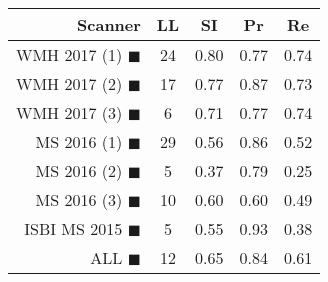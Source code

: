 \begin{tabular}{rcccc}
\toprule
Scanner & LL & SI & Pr & Re \\
\midrule
WMH 2017 (1) {\color[rgb]{ 1.00 0.00 0.00}$\blacksquare$} & 24 & 0.80 & 0.77 & 0.74 \\
WMH 2017 (2) {\color[rgb]{ 1.00 0.50 0.00}$\blacksquare$} & 17 & 0.77 & 0.87 & 0.73 \\
WMH 2017 (3) {\color[rgb]{ 1.00 0.80 0.00}$\blacksquare$} & 6 & 0.71 & 0.77 & 0.74 \\
MS  2016 (1) {\color[rgb]{ 0.20 0.80 0.00}$\blacksquare$} & 29 & 0.56 & 0.86 & 0.52 \\
MS  2016 (2) {\color[rgb]{ 0.00 0.40 1.00}$\blacksquare$} & 5 & 0.37 & 0.79 & 0.25 \\
MS  2016 (3) {\color[rgb]{ 0.60 0.00 1.00}$\blacksquare$} & 10 & 0.60 & 0.60 & 0.49 \\
ISBI MS 2015 {\color[rgb]{ 1.00 0.00 1.00}$\blacksquare$} & 5 & 0.55 & 0.93 & 0.38 \\
\midrule
ALL {\color[rgb]{ 1.00 1.00 1.00}$\blacksquare$} & 12 & 0.65 & 0.84 & 0.61 \\
\bottomrule
\end{tabular}